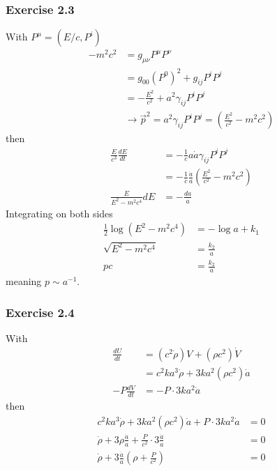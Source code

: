 \documentclass[10pt,a4paper]{article}
\theoremstyle{definition}
\begin{document}
\subsubsection{Exercise 2.3}
With $P^\mu=(E/c,P^i)$
\begin{align}
-m^2c^2
&=g_{\mu\nu}P^\mu P^\nu\\
&=g_{00}(P^0)^2+g_{ij}P^iP^j\\
&=-\frac{E^2}{c^2}+a^2\gamma_{ij}P^iP^j\\
&\rightarrow \vec{p}^2=a^2\gamma_{ij}P^iP^j=\left(\frac{E^2}{c^2}-m^2c^2\right)
\end{align}
then
\begin{align}
\frac{E}{c^3}\frac{dE}{dt}
&=-\frac{1}{c}a\dot{a}\gamma_{ij}P^iP^j\\
&=-\frac{1}{c}\frac{\dot{a}}{a}\left(\frac{E^2}{c^2}-m^2c^2\right)\\
\frac{E}{E^2-m^2c^4}dE&=-\frac{da}{a}
\end{align}
Integrating on both sides
\begin{align}
\frac{1}{2}\log(E^2-m^2c^4)&=-\log a+k_1\\
\sqrt{E^2-m^2c^4}&=\frac{k_2}{a}\\
pc&=\frac{k_2}{a}
\end{align}
meaning $p\sim a^{-1}$.


\subsubsection{Exercise 2.4}
With
\begin{align}
\frac{dU}{dt}
&=(c^2\dot\rho)V+(\rho c^2)\dot V\\
&=c^2ka^3\dot\rho+3ka^2(\rho c^2)\dot a\\
-P\frac{dV}{dt}
&=-P\cdot3ka^2\dot a
\end{align}
then
\begin{align}
c^2ka^3\dot\rho+3ka^2(\rho c^2)\dot a+P\cdot3ka^2\dot a&=0\\
\dot\rho+3\rho\frac{\dot a}{a}+\frac{P}{c^2}\cdot3\frac{\dot a}{a}&=0\\
\dot\rho+3\frac{\dot a}{a}\left(\rho+\frac{P}{c^2}\right)&=0
\end{align}
\end{document}
